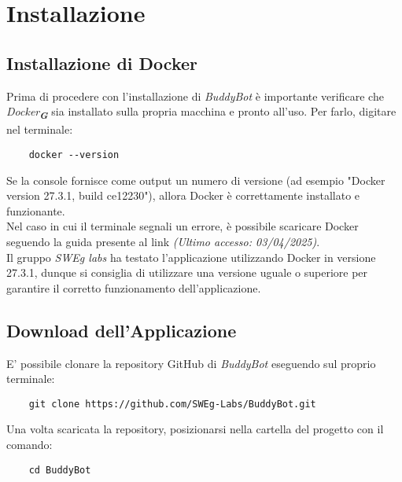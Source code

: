 

\section{Installazione}
\label{sec:installazione}

\subsection{Installazione di Docker}
Prima di procedere con l'installazione di \textit{BuddyBot} è importante verificare che \emph{Docker}\textsubscript{\textbf{\textit{G}}} sia installato sulla propria macchina e pronto all'uso.  
Per farlo, digitare nel terminale:
\begin{verbatim}
    docker --version
\end{verbatim}
Se la console fornisce come output un numero di versione (ad esempio "Docker version 27.3.1, build ce12230"), allora Docker è
correttamente
installato e funzionante.\\
Nel caso in cui il terminale segnali un errore, è possibile scaricare Docker seguendo la guida presente al link
\emph{(Ultimo accesso: 03/04/2025)}.\\
Il gruppo \emph{SWEg labs} ha testato l'applicazione utilizzando Docker in versione 27.3.1, dunque si consiglia di utilizzare una
versione uguale o superiore per garantire il corretto funzionamento dell'applicazione.

\subsection{Download dell'Applicazione}
E' possibile clonare la repository GitHub di \textit{BuddyBot} eseguendo sul proprio terminale:
\begin{verbatim}
    git clone https://github.com/SWEg-Labs/BuddyBot.git
\end{verbatim}
Una volta scaricata la repository, posizionarsi nella cartella del progetto con il comando:
\begin{verbatim}
    cd BuddyBot
\end{verbatim}

